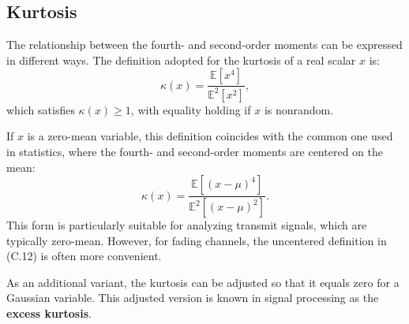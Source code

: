 \subsection{Kurtosis}

The relationship between the fourth- and second-order moments can be expressed in different ways.  
The definition adopted for the kurtosis of a real scalar \( x \) is:
\begin{equation}
\kappa(x) = \frac{\mathbb{E}[x^{4}]}{\mathbb{E}^{2}[x^{2}]},
\tag{C.12}
\end{equation}
which satisfies \( \kappa(x) \ge 1 \), with equality holding if \( x \) is nonrandom.

If \( x \) is a zero-mean variable, this definition coincides with the common one used in statistics, where the fourth- and second-order moments are centered on the mean:
\[
\kappa(x) = \frac{\mathbb{E}[(x - \mu)^4]}{\mathbb{E}^2[(x - \mu)^2]}.
\]
This form is particularly suitable for analyzing transmit signals, which are typically zero-mean.  
However, for fading channels, the uncentered definition in (C.12) is often more convenient.

As an additional variant, the kurtosis can be adjusted so that it equals zero for a Gaussian variable.  
This adjusted version is known in signal processing as the \textbf{excess kurtosis}.
